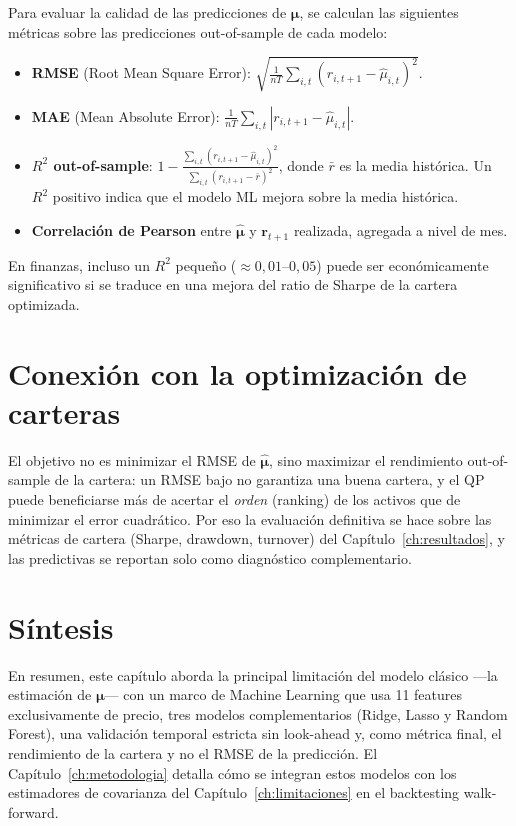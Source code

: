 Para evaluar la calidad de las predicciones de $\boldsymbol{\mu}$, se calculan
las siguientes métricas sobre las predicciones out-of-sample de cada modelo:

\begin{itemize}
    \item \textbf{RMSE} (Root Mean Square Error):
          $\sqrt{\frac{1}{nT} \sum_{i,t} (r_{i,t+1} - \hat{\mu}_{i,t})^2}$.
    \item \textbf{MAE} (Mean Absolute Error):
          $\frac{1}{nT} \sum_{i,t} |r_{i,t+1} - \hat{\mu}_{i,t}|$.
    \item \textbf{$R^2$ out-of-sample}:
          $1 - \frac{\sum_{i,t} (r_{i,t+1} - \hat{\mu}_{i,t})^2}
          {\sum_{i,t} (r_{i,t+1} - \bar{r})^2}$,
          donde $\bar{r}$ es la media histórica. Un $R^2$ positivo indica que
          el modelo ML mejora sobre la media histórica.
    \item \textbf{Correlación de Pearson} entre $\hat{\boldsymbol{\mu}}$ y
          $\mathbf{r}_{t+1}$ realizada, agregada a nivel de mes.
\end{itemize}

En finanzas, incluso un $R^2$ pequeño
($\approx 0{,}01$--$0{,}05$) puede ser económicamente significativo si se
traduce en una mejora del ratio de Sharpe de la cartera optimizada.

\section{Conexión con la optimización de carteras}

El objetivo no es minimizar el RMSE de
$\hat{\boldsymbol{\mu}}$, sino maximizar el rendimiento out-of-sample de la
cartera: un RMSE bajo no garantiza una buena cartera, y el QP puede
beneficiarse más de acertar el \textit{orden} (ranking) de los activos que de
minimizar el error cuadrático. Por eso la evaluación definitiva se hace sobre
las métricas de cartera (Sharpe, drawdown, turnover) del
Capítulo~\ref{ch:resultados}, y las predictivas se reportan solo como
diagnóstico complementario.

\section{Síntesis}

En resumen, este capítulo aborda la principal limitación del modelo clásico
---la estimación de $\boldsymbol{\mu}$--- con un marco de Machine Learning que
usa 11 features exclusivamente de precio, tres modelos complementarios (Ridge,
Lasso y Random Forest), una validación temporal estricta sin look-ahead y, como
métrica final, el rendimiento de la cartera y no el RMSE de la predicción. El
Capítulo~\ref{ch:metodologia} detalla cómo se integran estos modelos con los
estimadores de covarianza del Capítulo~\ref{ch:limitaciones} en el backtesting
walk-forward.
